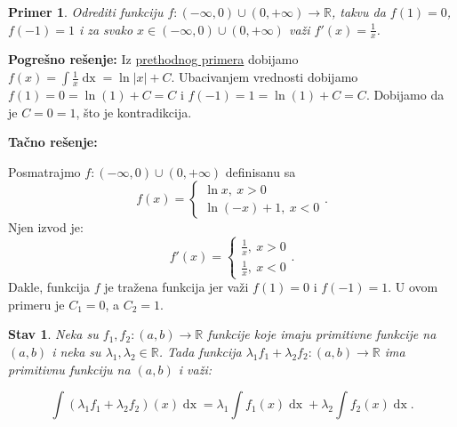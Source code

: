 \documentclass{article}
\newtheorem{stav}{Stav}[section]
\newtheorem{prim}{Primer}[section]
\DeclareMathOperator{\dx}{dx}
\begin{document}
\begin{primbox}
    \label{primer_1.5}
    \begin{prim}
        Odrediti funkciju $f: \left(-\infty, 0\right)\cup\left(0, +\infty\right)
            \longrightarrow \mathbb{R}$, takvu da $f\left(1\right) = 0$,
        $f\left(-1\right) = 1$ i za svako $x \in \left(-\infty, 0\right)
            \cup\left(0, +\infty\right)$ važi
        $\displaystyle f'\left(x\right) = \frac{1}{x}$.
    \end{prim}
    \textbf{Pogrešno rešenje:} Iz \hyperref[primer_1.4]{prethodnog primera} dobijamo $\displaystyle f\left(x\right) = \int\frac{1}{x}\dx = \ln|x| + C$. Ubacivanjem vrednosti
    dobijamo $f\left(1\right)  = 0 = \ln\left(1\right) + C=C$ i $f\left(-1\right) = 1 = \ln\left(1\right) + C =C$.
    Dobijamo da je $C=0=1$, što je kontradikcija.\par
    \textbf{Tačno rešenje:}\par
    Posmatrajmo $f: \left(-\infty, 0\right)\cup\left(0, +\infty\right)$
    definisanu sa
    $$
        f\left(x\right) =
        \begin{cases}
            \ln x,\ x > 0 \\
            \ln \left(-x\right) + 1,\ x < 0
        \end{cases}.
    $$
    Njen izvod je:
    $$f'\left(x\right) =
        \begin{cases}
            \frac{1}{x},\ x > 0 \\
            \frac{1}{x},\ x < 0
        \end{cases}.
    $$
    Dakle, funkcija $f$ je tražena funkcija jer važi
    $f\left(1\right) = 0$ i $f\left(-1\right) = 1$. U ovom primeru je $C_1=0$, a $C_2=1$.
\end{primbox}

\begin{stavbox}
    \label{stav_1.2}
    \begin{stav}
        Neka su $f_1, f_2 : \left(a, b\right) \longrightarrow \mathbb{R}$
        funkcije koje imaju primitivne funkcije na $\left(a, b\right)$ i neka
        su $\lambda_1 , \lambda_2 \in \mathbb{R}$. Tada funkcija
        $\lambda_1 f_1 + \lambda_2 f_2 : \left(a, b\right) \longrightarrow
            \mathbb{R}$ ima primitivnu funkciju na $\left(a, b\right)$ i važi:\par
        $$\int \left(\lambda_1 f_1 + \lambda_2 f_2\right)\left(x\right)\dx = \lambda_1\int
            f_1\left(x\right) \dx + \lambda_2\int f_2\left(x\right) \dx.$$
    \end{stav}
\end{stavbox}
\end{document}
